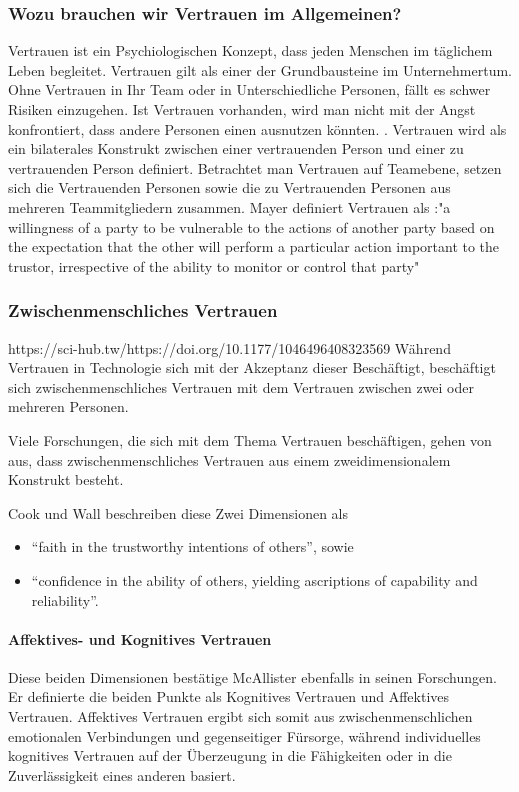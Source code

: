 \documentclass[a4paper,11pt]{article}%
\renewcommand{\\}{\vspace*{0.5\baselineskip} \newline}
\begin{document}
{		\subsubsection{Wozu brauchen wir Vertrauen im Allgemeinen?}
		Vertrauen ist ein Psychiologischen Konzept, dass jeden Menschen im täglichem Leben begleitet.
Vertrauen gilt als einer der Grundbausteine im Unternehmertum. Ohne Vertrauen in Ihr Team oder in Unterschiedliche Personen, fällt es schwer Risiken einzugehen. Ist Vertrauen vorhanden, wird man nicht mit der Angst konfrontiert, dass andere Personen einen ausnutzen könnten. \citep[p.1152]{breuer2016does}.
Vertrauen wird als ein bilaterales Konstrukt zwischen einer vertrauenden Person und einer zu vertrauenden Person definiert.
\citep[p.728-729]{mayer1995integrative}
Betrachtet man Vertrauen auf Teamebene, setzen sich die Vertrauenden Personen sowie die zu Vertrauenden Personen aus mehreren Teammitgliedern zusammen.
 Mayer definiert Vertrauen als :"a willingness of a party to be vulnerable to the actions of another party based on the expectation that the other will perform a particular action important to the trustor, irrespective of the ability to monitor or control that party" \citep[p.712]{mayer1995integrative} \\

		\subsubsection{Zwischenmenschliches Vertrauen}
		https://sci-hub.tw/https://doi.org/10.1177/1046496408323569
Während Vertrauen in Technologie sich mit der Akzeptanz dieser Beschäftigt, beschäftigt sich zwischenmenschliches Vertrauen mit dem Vertrauen zwischen zwei oder mehreren Personen. \citep{mcknight2011trust}

Viele Forschungen, die sich mit dem Thema Vertrauen beschäftigen, gehen von aus, dass zwischenmenschliches Vertrauen aus einem zweidimensionalem Konstrukt besteht. \citep{johnson2005cognitive} \citep{cook1980new}

Cook und Wall beschreiben diese Zwei Dimensionen als  \begin{itemize}
\item{ “faith in the trustworthy intentions of others”, sowie}
\item{“confidence in the ability of others, yielding ascriptions of capability and reliability”.}
\end{itemize}

\paragraph{Affektives- und Kognitives Vertrauen}
Diese beiden Dimensionen bestätige McAllister ebenfalls in seinen Forschungen. Er definierte die beiden Punkte als Kognitives Vertrauen und Affektives Vertrauen.
Affektives Vertrauen ergibt sich somit aus zwischenmenschlichen emotionalen Verbindungen und gegenseitiger Fürsorge, während individuelles kognitives Vertrauen auf der Überzeugung in die Fähigkeiten oder in die Zuverlässigkeit eines anderen basiert. \citep{mcallister1995affect} \\

}
\end{document}
